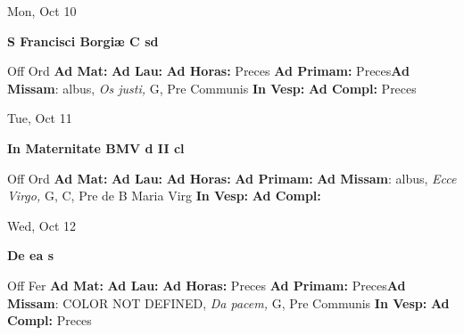\documentclass[10pt]{memoir}
\begin{document}
\begin{center}
\begin{minipage}{3.5in}
\vspace{2em}
\begin{center}Mon, Oct 10
\end{center}
\textbf{ \large S Francisci Borgiæ C
\textnormal{\normalsize sd}}

\begin{justify}Off Ord
\textbf{Ad Mat: }
\textbf{Ad Lau: }
\textbf{Ad Horas: }Preces
\textbf{Ad Primam: }Preces\textbf{Ad Missam}: albus, \textit{Os justi,} G, Pre Communis
\textbf{In Vesp: }
\textbf{Ad Compl: }Preces
\end{justify}
\end{minipage}
\end{center}

\begin{center}
\begin{minipage}{3.5in}
\vspace{2em}
\begin{center}Tue, Oct 11
\end{center}
\textbf{ \large In Maternitate BMV
\textnormal{\normalsize d II cl}}

\begin{justify}Off Ord
\textbf{Ad Mat: }
\textbf{Ad Lau: }
\textbf{Ad Horas: }
\textbf{Ad Primam: }\textbf{Ad Missam}: albus, \textit{Ecce Virgo,} G, C, Pre de B Maria Virg
\textbf{In Vesp: }
\textbf{Ad Compl: }
\end{justify}
\end{minipage}
\end{center}

\begin{center}
\begin{minipage}{3.5in}
\vspace{2em}
\begin{center}Wed, Oct 12
\end{center}
\textbf{ \large De ea
\textnormal{\normalsize s}}

\begin{justify}Off Fer
\textbf{Ad Mat: }
\textbf{Ad Lau: }
\textbf{Ad Horas: }Preces
\textbf{Ad Primam: }Preces\textbf{Ad Missam}: COLOR NOT DEFINED, \textit{Da pacem,} G, Pre Communis
\textbf{In Vesp: }
\textbf{Ad Compl: }Preces
\end{justify}
\end{minipage}
\end{center}
\end{document}
